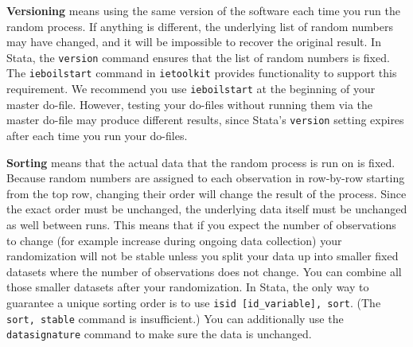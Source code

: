 \textbf{Versioning} means using the same version of the software each time you run the random process.
If anything is different, the underlying list of random numbers may have changed,
and it will be impossible to recover the original result.
In Stata, the \texttt{version} command ensures that the list of random numbers is fixed.
The \texttt{ieboilstart} command in \texttt{ietoolkit} provides functionality to support this requirement.
We recommend you use \texttt{ieboilstart} at the beginning of your master do-file.
However, testing your do-files without running them
via the master do-file may produce different results,
since Stata's \texttt{version} setting expires after each time you run your do-files.

\textbf{Sorting} means that the actual data that the random process is run on is fixed.
Because random numbers are assigned to each observation in row-by-row starting from
the top row,
changing their order will change the result of the process.
Since the exact order must be unchanged, the underlying data itself must be unchanged as well between runs.
This means that if you expect the number of observations to change (for example increase during
ongoing data collection) your randomization will not be stable unless you split your data up into
smaller fixed datasets where the number of observations does not change. You can combine all
those smaller datasets after your randomization.
In Stata, the only way to guarantee a unique sorting order is to use
\texttt{isid [id\_variable], sort}. (The \texttt{sort, stable} command is insufficient.)
You can additionally use the \texttt{datasignature} command to make sure the
data is unchanged.

